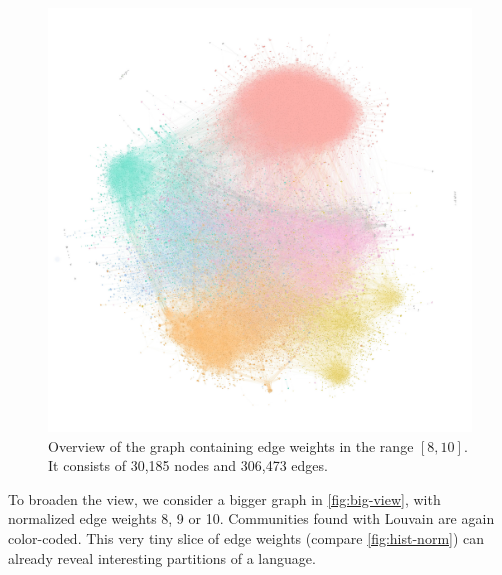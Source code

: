 \vspace{-1em}

\begin{figure}[H]
    \centering
    \includegraphics[width=\linewidth, trim=1cm 4.8cm 0.5cm 3.2cm, clip]{assets/big view-min-min.jpg}
    \caption{Overview of the graph containing edge weights in the range $[8,10]$. It consists of 30,185 nodes and 306,473 edges.}
    \label{fig:big-view}
\end{figure}

\vspace{-1.5em}

To broaden the view, we consider a bigger graph in \autoref{fig:big-view}, with normalized edge weights 8, 9 or 10. Communities found with Louvain are again color-coded. This very tiny slice of edge weights (compare \autoref{fig:hist-norm}) can already reveal interesting partitions of a language.

